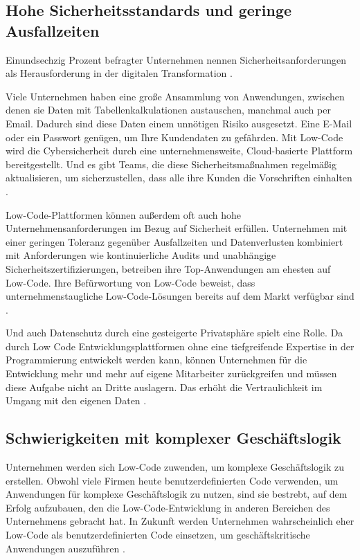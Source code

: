 \documentclass[12pt]{article} %
\begin{document}
	\subsection{Hohe Sicherheitsstandards und geringe Ausfallzeiten} 
	Einundsechzig Prozent befragter Unternehmen nennen Sicherheitsanforderungen als Herausforderung in der digitalen Transformation \autocite{EmmaVanPelt.2019}. \newline  %
	
	Viele Unternehmen haben eine große Ansammlung von Anwendungen, zwischen denen sie Daten mit Tabellenkalkulationen austauschen, manchmal auch per Email. Dadurch sind diese Daten einem unnötigen Risiko ausgesetzt. Eine E-Mail oder ein Passwort genügen, um Ihre Kundendaten zu gefährden. Mit Low-Code wird die Cybersicherheit durch eine unternehmensweite, Cloud-basierte Plattform bereitgestellt. Und es gibt Teams, die diese Sicherheitsmaßnahmen regelmäßig aktualisieren, um sicherzustellen, dass alle ihre Kunden die Vorschriften einhalten \autocite{KevinShuler.2023}. \newline
	
	Low-Code-Plattformen können außerdem oft auch hohe Unternehmensanforderungen im Bezug auf Sicherheit erfüllen. Unternehmen mit einer geringen Toleranz gegenüber Ausfallzeiten und Datenverlusten kombiniert mit Anforderungen wie kontinuierliche Audits und unabhängige Sicherheitszertifizierungen, betreiben ihre Top-Anwendungen am ehesten auf Low-Code. Ihre Befürwortung von Low-Code beweist, dass unternehmenstaugliche Low-Code-Lösungen bereits auf dem Markt verfügbar sind \autocite{EmmaVanPelt.2019}. \newline
	
	Und auch Datenschutz durch eine gesteigerte Privatsphäre spielt eine Rolle. Da durch Low Code Entwicklungsplattformen ohne eine tiefgreifende Expertise in der Programmierung entwickelt werden kann, können Unternehmen für die Entwicklung mehr und mehr auf eigene Mitarbeiter zurückgreifen und müssen diese Aufgabe nicht an Dritte auslagern. Das erhöht die Vertraulichkeit im Umgang mit den eigenen Daten \autocite{Sanchis.2020b}.
	
	\subsection{Schwierigkeiten mit komplexer Geschäftslogik}
	Unternehmen werden sich Low-Code zuwenden, um komplexe Geschäftslogik zu erstellen.
	Obwohl viele Firmen heute benutzerdefinierten Code verwenden, um Anwendungen für komplexe Geschäftslogik zu nutzen, sind sie bestrebt, auf dem Erfolg aufzubauen, den die Low-Code-Entwicklung in anderen Bereichen des Unternehmens gebracht hat. In Zukunft werden Unternehmen wahrscheinlich eher Low-Code als benutzerdefinierten Code einsetzen, um geschäftskritische Anwendungen auszuführen \autocite{EmmaVanPelt.2019}.
	
\end{document}
